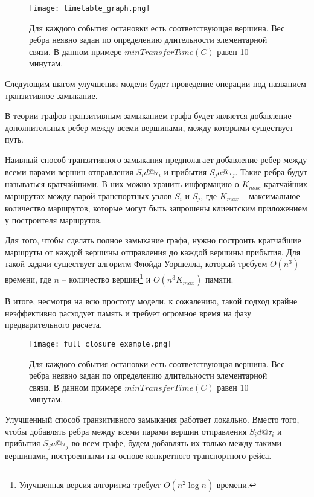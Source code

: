 \begin{figure}[!h]
	\centering
	\texttt{[image: timetable\_graph.png]}
	\caption{Для каждого события остановки есть соответствующая вершина. Вес ребра неявно задан по определению длительности элементарной связи. В данном примере $minTransferTime(C)$ равен 10 минутам.}\label{fig4}
\end{figure}
\FloatBarrier 

Следующим шагом улучшения модели будет проведение операции под названием транзитивное замыкание.

\begin{definition}
	В теории графов транзитивным замыканием графа будет является добавление дополнительных ребер между всеми вершинами, между которыми существует путь.
\end{definition}

Наивный способ транзитивного замыкания предполагает добавление ребер между всеми парами вершин отправления $S_id@\tau_i$ и прибытия $S_ja@\tau_j$. Такие ребра будут называться кратчайшими. В них можно хранить информацию о $K_{max}$ кратчайших маршрутах между парой транспортных узлов $S_i$ и $S_j$, где $K_{max}$ -- максимальное количество маршрутов, которые могут быть запрошены клиентским приложением у построителя маршрутов. 

Для того, чтобы сделать полное замыкание графа, нужно построить кратчайшие маршруты от каждой вершины отправления до каждой вершины прибытия. Для такой задачи существует алгоритм Флойда-Уоршелла, который требуем $O(n^3)$ времени, где $n$ -- количество вершин\footnote{Улучшенная версия алгоритма требует $O(n^2\log n)$ времени.} и $O(n^3K_{max})$ памяти.

В итоге, несмотря на всю простоту модели, к сожалению, такой подход крайне неэффективно расходует память и требует огромное время на фазу предварительного расчета. 

\begin{figure}[!h]
	\centering
	\texttt{[image: full\_closure\_example.png]}
	\caption{Для каждого события остановки есть соответствующая вершина. Вес ребра неявно задан по определению длительности элементарной связи. В данном примере $minTransferTime(C)$ равен 10 минутам.}\label{fig4}
\end{figure}
\FloatBarrier 

Улучшенный способ транзитивного замыкания работает локально. Вместо того, чтобы добавлять ребра между всеми парами вершин отправления $S_id@\tau_i$ и прибытия $S_ja@\tau_j$ во всем графе, будем добавлять их только между такими вершинами, построенными на основе конкретного транспортного рейса.

